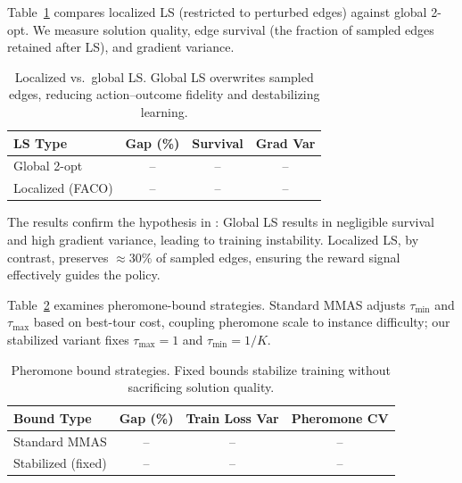 \documentclass[sigconf,anonymous,review]{acmart}
\theoremstyle{definition}
\theoremstyle{plain}
\newcommand{\MMAS}{\textsc{MMAS}}
\begin{document}
Table~\ref{tab:ablation-ls} compares localized LS (restricted to perturbed edges) against global 2-opt.
We measure solution quality, edge survival (the fraction of sampled edges retained after LS), and gradient variance.

\begin{table}[t]
\centering
\caption{Localized vs.\ global LS. Global LS overwrites sampled edges, reducing action--outcome fidelity and destabilizing learning.}
\label{tab:ablation-ls}
\small
\begin{tabular}{lccc}
\toprule
LS Type & Gap (\%) & Survival & Grad Var \\
\midrule
Global 2-opt & -- & -- & -- \\
Localized (FACO) & -- & -- & -- \\
\bottomrule
\end{tabular}
\end{table}

The results confirm the hypothesis in : Global LS results in negligible survival and high gradient variance, leading to training instability. Localized LS, by contrast, preserves $\approx 30\%$ of sampled edges, ensuring the reward signal effectively guides the policy.

Table~\ref{tab:ablation-mmas} examines pheromone-bound strategies.
Standard \MMAS{} adjusts $\tau_{\min}$ and $\tau_{\max}$ based on best-tour cost, coupling pheromone scale to instance difficulty; our stabilized variant fixes $\tau_{\max}=1$ and $\tau_{\min}=1/K$.

\begin{table}[t]
\centering
\caption{Pheromone bound strategies. Fixed bounds stabilize training without sacrificing solution quality.}
\label{tab:ablation-mmas}
\small
\begin{tabular}{lccc}
\toprule
Bound Type & Gap (\%) & Train Loss Var & Pheromone CV \\
\midrule
Standard \MMAS{} & -- & -- & -- \\
Stabilized (fixed) & -- & -- & -- \\
\bottomrule
\end{tabular}
\end{table}
\end{document}
